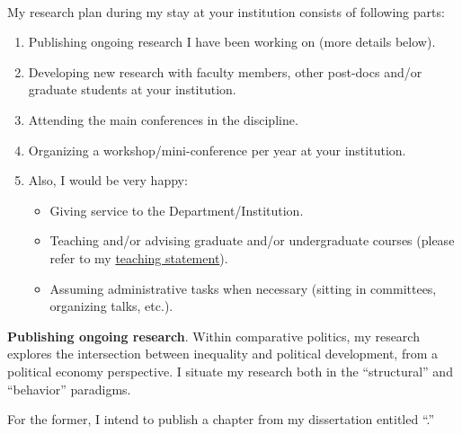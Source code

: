 \documentclass[10pt,stdletter,dateno,sigleft]{newlfm} %
\begin{document}
\begin{newlfm}




\vspace{-2cm}{\bf \huge Research Plan}\\


My research plan during my stay at your institution consists of following parts: 

\begin{enumerate}
  \item Publishing ongoing research I have been working on (more details below).
  \item Developing new research with faculty members, other post-docs and/or graduate students at your institution.
  \item Attending the main conferences in the discipline.
  \item Organizing a workshop/mini-conference per year at your institution.
  \item Also, I would be very happy: 
    \begin{itemize}
      \item Giving service to the Department/Institution.
      \item Teaching and/or advising graduate and/or undergraduate courses (please refer to my \href{http://github.com/hbahamonde/Job_Market/raw/master/Bahamonde_Teaching_Statement.pdf}{teaching statement}).
      \item Assuming administrative tasks when necessary (sitting in committees, organizing talks, etc.).
    \end{itemize}
\end{enumerate}


{\bf Publishing ongoing research}. Within comparative politics, my research explores the intersection between inequality and political development, from a political economy perspective. I situate my research both in the ``structural'' and ``behavior'' paradigms. 

For the former, I intend to publish a chapter from my dissertation entitled ``\href{https://github.com/hbahamonde/Earthquake_Paper/raw/master/Bahamonde_Earthquake_Paper.pdf}{\unskip}.'' \unskip 


\end{newlfm}
\end{document}
